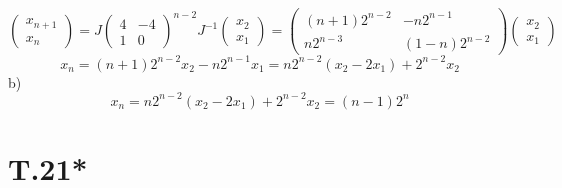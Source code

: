 \documentclass[a4paper,12pt]{article} %
\begin{document}
$$\begin{pmatrix*}
    x_{n+1}\\
    x_{n}
\end{pmatrix*}=J\begin{pmatrix*}
    4&-4\\
    1&0
\end{pmatrix*}^{n-2}J^{-1}\begin{pmatrix*}
    x_{2}\\
    x_{1}
\end{pmatrix*}=\begin{pmatrix*}
    (n+1)2^{n-2}&-n2^{n-1}\\
    n2^{n-3}&(1-n)2^{n-2}
\end{pmatrix*}\begin{pmatrix*}
    x_{2}\\
    x_{1}
\end{pmatrix*}$$
$$x_n=(n+1)2^{n-2}x_2-n2^{n-1}x_1=n2^{n-2}(x_2-2x_1)+2^{n-2}x_2$$
b)$$x_n=n2^{n-2}(x_2-2x_1)+2^{n-2}x_2=(n-1)2^{n}$$
\section*{T.21*}
\end{document}

